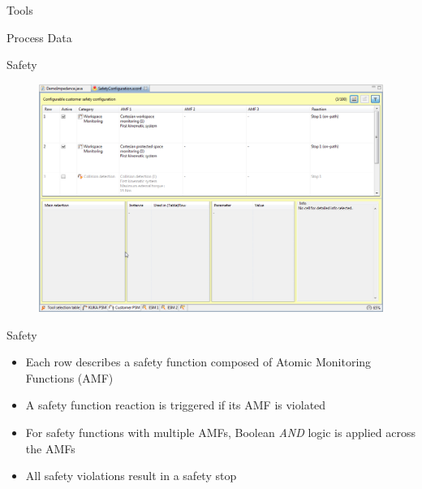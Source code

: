 \documentclass{beamer}
\begin{document}
\begin{frame}{Tools}
\end{frame}

\begin{frame}{Process Data}
\end{frame}

\begin{frame}{Safety}
  \begin{figure}
    \includegraphics[width=\textwidth]{sunrise-workbench-safety}
  \end{figure}
\end{frame}

\begin{frame}{Safety}
  \begin{block}{}
    \begin{itemize}
      \item Each row describes a safety function composed of Atomic Monitoring Functions (AMF)
      \item A safety function reaction is triggered if its AMF is violated
      \item For safety functions with multiple AMFs, Boolean \textit{AND} logic is applied across the AMFs
      \item All safety violations result in a safety stop
    \end{itemize}
  \end{block}
\end{frame}
\end{document}
